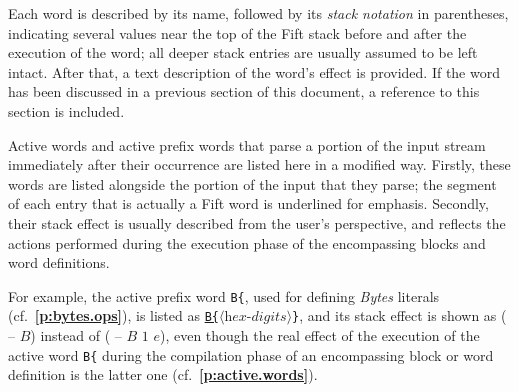 \documentclass[12pt,oneside]{article}
\def\refpoint#1{{\rm\textbf{\ref{#1}}}}
\let\ptref=\refpoint
\begin{document}
Each word is described by its name, followed by its {\em stack notation\/} in parentheses, indicating several values near the top of the Fift stack before and after the execution of the word; all deeper stack entries are usually assumed to be left intact. After that, a text description of the word's effect is provided. If the word has been discussed in a previous section of this document, a reference to this section is included.

Active words and active prefix words that parse a portion of the input stream immediately after their occurrence are listed here in a modified way. Firstly, these words are listed alongside the portion of the input that they parse; the segment of each entry that is actually a Fift word is underlined for emphasis. Secondly, their stack effect is usually described from the user's perspective, and reflects the actions performed during the execution phase of the encompassing blocks and word definitions.

For example, the active prefix word {\tt B\{}, used for defining {\em Bytes\/} literals (cf.~\ptref{p:bytes.ops}), is listed as {\tt \underline{B\{}$\langle\textit{hex-digits}\rangle$\}}, and its stack effect is shown as ( -- $B$) instead of ( -- $B$ $1$ $e$), even though the real effect of the execution of the active word {\tt B\{} during the compilation phase of an encompassing block or word definition is the latter one (cf.~\ptref{p:active.words}).
\end{document}
